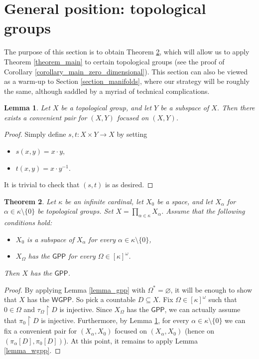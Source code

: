 \documentclass{amsart}
\theoremstyle{plain}
\newtheorem{theorem}{Theorem}[section]
\newtheorem{lemma}[theorem]{Lemma}
\theoremstyle{definition}
\newcommand{\re}{\upharpoonright}
\newcommand{\GPP}{\mathsf{GPP}}
\newcommand{\WGPP}{\mathsf{WGPP}}
\begin{document}
\section{General position: topological groups}\label{section_groups}

The purpose of this section is to obtain Theorem \ref{theorem_gpp_groups}, which will allow us to apply Theorem \ref{theorem_main} to certain topological groups (see the proof of Corollary \ref{corollary_main_zero_dimensional}). This section can also be viewed as a warm-up to Section \ref{section_manifolds}, where our strategy will be roughly the same, although saddled by a myriad of technical complications.

\begin{lemma}\label{lemma_convenient_pair_groups}
Let $X$ be a topological group, and let $Y$ be a subspace of $X$. Then there exists a convenient pair for $(X,Y)$ focused on $(X,Y)$.	
\end{lemma}
\begin{proof}
Simply define $s,t:X\times Y\longrightarrow X$ by setting
\begin{itemize}
\item $s(x,y)=x\cdot y$,
\item $t(x,y)=x\cdot y^{-1}$.
\end{itemize}
It is trivial to check that $(s,t)$ is as desired.
\end{proof}

\begin{theorem}\label{theorem_gpp_groups}
Let $\kappa$ be an infinite cardinal, let $X_0$ be a space, and let $X_\alpha$ for $\alpha\in\kappa\setminus\{0\}$ be topological groups. Set $X=\prod_{\alpha\in\kappa}X_\alpha$. Assume that the following conditions hold:
\begin{itemize}
\item $X_0$ is a subspace of $X_\alpha$ for every $\alpha\in\kappa\setminus\{0\}$,
\item $X_\Omega$ has the $\GPP$ for every $\Omega\in [\kappa]^\omega$.
\end{itemize}
Then $X$ has the $\GPP$.
\end{theorem}
\begin{proof}
By applying Lemma \ref{lemma_gpp} with $\Omega^\ast=\varnothing$, it will be enough to show that $X$ has the $\WGPP$. So pick a countable $D\subseteq X$. Fix $\Omega\in [\kappa]^\omega$ such that $0\in\Omega$ and $\tau_\Omega\re D$ is injective. Since $X_\Omega$ has the $\GPP$, we can actually assume that $\pi_0\re D$ is injective. Furthermore, by Lemma \ref{lemma_convenient_pair_groups}, for every $\alpha\in\kappa\setminus\{0\}$ we can fix a convenient pair for $(X_\alpha,X_0)$ focused on $(X_\alpha,X_0)$ (hence on $(\pi_\alpha[D],\pi_0[D])$). At this point, it remains to apply Lemma \ref{lemma_wgpp}.
\end{proof}
\end{document}
